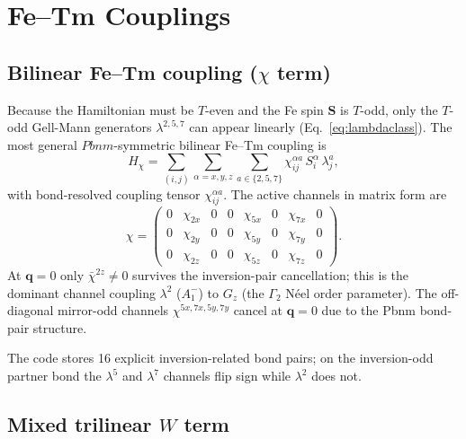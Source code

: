 \documentclass[11pt]{article}
\newcommand{\bS}{\mathbf{S}}
\begin{document}
\section{Fe--Tm Couplings}
\label{sec:FeTm}

\subsection{Bilinear Fe--Tm coupling ($\chi$ term)}

Because the Hamiltonian must be $T$-even and the Fe spin $\bS$ is
$T$-odd, only the $T$-odd Gell-Mann generators $\lambda^{2,5,7}$
can appear linearly (Eq.~\eqref{eq:lambdaclass}).  The most general
$Pbnm$-symmetric bilinear Fe--Tm coupling is
\begin{equation}
H_\chi = \sum_{(i,j)}\sum_{\alpha=x,y,z}\sum_{a\in\{2,5,7\}}
\chi^{\alpha a}_{ij}\,S_i^\alpha\,\lambda_j^a,
\label{eq:Hchi}
\end{equation}
with bond-resolved coupling tensor $\chi^{\alpha a}_{ij}$.  The
active channels in matrix form are
\begin{equation}
\chi =
\begin{pmatrix}
0 & \chi_{2x} & 0 & 0 & \chi_{5x} & 0 & \chi_{7x} & 0 \\
0 & \chi_{2y} & 0 & 0 & \chi_{5y} & 0 & \chi_{7y} & 0 \\
0 & \chi_{2z} & 0 & 0 & \chi_{5z} & 0 & \chi_{7z} & 0
\end{pmatrix}.
\end{equation}
At $\mathbf{q}=0$ only $\bar\chi^{2z}\neq 0$ survives the
inversion-pair cancellation; this is the dominant channel coupling
$\lambda^2$ ($A_1^-$) to $G_z$ (the $\Gamma_2$ N\'{e}el order
parameter).  The off-diagonal mirror-odd channels
$\chi^{5x,7x,5y,7y}$ cancel at $\mathbf{q}=0$ due to the Pbnm
bond-pair structure.

The code stores 16 explicit inversion-related bond pairs;
on the inversion-odd partner bond the $\lambda^5$ and $\lambda^7$
channels flip sign while $\lambda^2$ does not.

\subsection{Mixed trilinear $W$ term}
\end{document}
